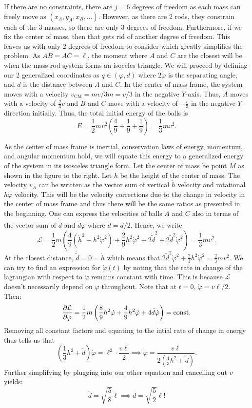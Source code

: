 \documentclass[11pt]{scrartcl}
\begin{document}
\begin{soln}
If there are no constraints, there are $j = 6$ degrees of freedom as each mass can freely move as $(x_A, y_A, x_B, \dots)$. However, as there are 2 rods, they constrain each of the 3 masses, so there are only $3$ degrees of freedom. Furthermore, if we fix the center of mass, then that gets rid of another degree of freedom. This leaves us with only 2 degrees of freedom to consider which greatly simplifies the problem. As $AB = AC = \ell$, the moment where $A$ and $C$ are the closest will be when the mass-rod system forms an isoceles triangle. We will proceed by defining our 2 generalized coordinates as $q \in (\varphi, d)$ where $2\varphi$ is the separating angle, and $d$ is the distance between $A$ and $C$. In the center of mass frame, the system moves with a velocity $v_{\text{CM}} = mv/3m = v/3$ in the negative $Y$-axis. Thus, $A$ moves with a velocity of $\frac{2}{3}v$ and $B$ and $C$ move with a velocity of $-\frac{v}{3}$ in the negative $Y$-direction initially. Thus, the total initial energy of the balls is 
\[E = \frac{1}{2}mv^2 \left(\frac{4}{9} + \frac{1}{9} + \frac{1}{9}\right) = \frac{1}{3}mv^2.\]

\noindent As the center of mass frame is inertial, conservation laws of energy, momentum, and angular momentum hold, we will equate this energy to a generalized energy of the system in its isosceles triangle form. 
Let the center of mass be point $M$ as shown in the figure to the right. Let $h$ be the height of the center of mass. The velocity $v_A$ can be written as the vector sum of vertical $\dot h$ velocity and rotational $h \dot \varphi$ velocity. This will be the velocity corrections due to the change in velocity in the center of mass frame and thus there will be the same ratios as presented in the beginning. One can express the velocities of balls $A$ and $C$ also in terms of the vector sum of $\dot{\tilde{d}}$ and $\tilde d\dot \varphi$ where $\tilde{d} = d/2$. Hence, we write 
\[\mathcal L = \frac{1}{2}m \left(\frac{4}{9} \left(\dot h^2 + h^2 \dot \varphi^2\right) + \frac{2}{9}h^2\dot \varphi^2 + 2 \dot{\tilde{d}}^2 + 2\tilde{d}^2\dot\varphi^2\right) = \frac{1}{3}mv^2.\]
At the closest distance, $\dot{\tilde{d}} = 0 = \dot h$ which means that $2\tilde{d}^2\dot\varphi^2 + \frac{2}{3}h^2 \dot\varphi^2 = \frac{2}{3}mv^2$. We can try to find an expression for $\dot \varphi (t)$ by noting that the rate in change of the lagrangian with respect to $\dot \varphi$ remains constant with time. This is because $\mathcal L$ doesn't necessarily depend on $\varphi$ throughout. Note that at $t = 0$, $\dot \varphi = v\ell/2$. Then:
\[\pdv{\mathcal L}{\dot \varphi} = \frac{1}{2}m \left(\frac{8}{9}h^2\dot\varphi + \frac{4}{9}h^2\dot\varphi + 4\tilde{d}\dot\varphi\right) = \text{const}.\]
Removing all constant factors and equating to the intial rate of change in energy thus tells us that 
\[\left(\frac{1}{3}h^2 + \tilde{d}\right)\dot \varphi = \ell^2 \cdot \frac{v\ell}{2} \implies \dot\varphi = \frac{v\ell}{2 \left(\frac{1}{3}h^2 + \tilde{d}\right)}.\]
Further simplifying by plugging into our other equation and cancelling out $v$ yields:
\[\tilde{d} = \sqrt{\frac{5}{8}}\ell \implies d = \sqrt{\frac{5}{2}}\ell!\]
\end{soln}
\end{document}
